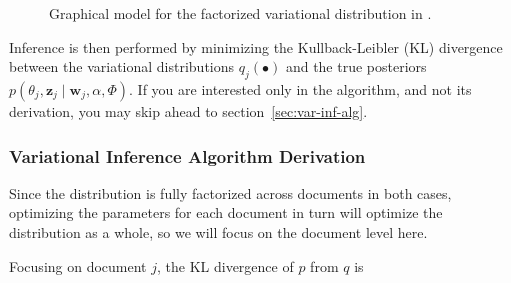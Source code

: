 \documentclass[11pt]{article}
\begin{document}
\begin{figure}[h]
  \begin{center}
  \end{center}
  \caption{Graphical model for the factorized variational distribution in
  \citet{Blei:2003:LDA}.}
  \label{fig:factdist}
\end{figure}

Inference is then performed by minimizing the Kullback-Leibler (KL)
divergence between the variational distributions $q_j(\bullet)$ and the
true posteriors $p(\theta_j, \mathbf{z}_j \mid \mathbf{w}_j, \alpha,
\Phi)$. If you are interested only in the algorithm, and not its
derivation, you may skip ahead to section~\ref{sec:var-inf-alg}.

\subsubsection{Variational Inference Algorithm Derivation}
\label{sec:var-inf-derivation}
Since the distribution is fully factorized across documents in both
cases, optimizing the parameters for each document in turn will optimize
the distribution as a whole, so we will focus on the document level here.

Focusing on document $j$, the KL divergence of $p$ from $q$ is
\end{document}
